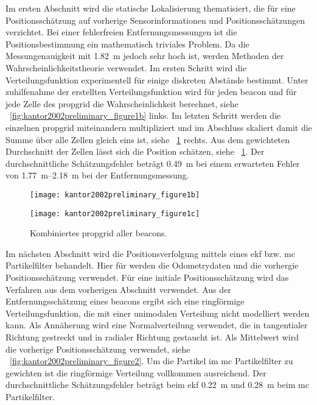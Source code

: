 Im ersten Abschnitt wird die statische Lokalisierung thematisiert, die für eine Positionsschätzung auf vorherige Sensorinformationen und Positionsschätzungen verzichtet. Bei einer fehlerfreien Entfernungsmessungen ist die Positionsbestimmung ein mathematisch triviales Problem. Da die Messungenauigkeit mit \SI{1.82}{\metre} jedoch sehr hoch ist, werden Methoden der Wahrscheinlichkeitstheorie verwendet. Im ersten Schritt wird die Verteilungsfunktion experimentell für einige diskreten Abstände bestimmt. Unter zuhilfenahme der erstellten Verteilungsfunktion wird für jeden \Gls{beacon} und für jede Zelle des \Gls{propgrid} die Wahrscheinlichkeit berechnet, siehe \figurename~\ref{fig:kantor2002preliminary_figure1b} links. Im letzten Schritt werden die einzelnen \Gls{propgrid} miteinandern multipliziert und im Abschluss skaliert damit die Summe über alle Zellen gleich eins ist, siehe \figurename~\ref{fig:kantor2002preliminary_figure1c} rechts. Aus dem gewichteten Durchschnitt der Zellen lässt sich die Position schätzen, siehe \figurename~\ref{fig:kantor2002preliminary_figure1c}. Der durchschnittliche Schätzungsfehler beträgt \SI{0.49}{\metre} bei einem erwarteten Fehler von \SIrange{1,77}{2,18}{\metre} bei der Entfernungsmessung.

\begin{figure}[htbp]
  \begin{minipage}[t]{0.45\linewidth}
    \centering
    \texttt{[image: kantor2002preliminary\_figure1b]}
    \caption{Links: \Gls{propgrid} pro \Gls{beacon}. Rechts: Kombination zweier \Glspl{propgrid}.}
    \label{fig:kantor2002preliminary_figure1b}
  \end{minipage}
  \hfill
  \begin{minipage}[t]{0.45\linewidth}
    \centering
    \texttt{[image: kantor2002preliminary\_figure1c]}
    \caption{Kombiniertes \Gls{propgrid} aller \Glspl{beacon}.}
    \label{fig:kantor2002preliminary_figure1c}
  \end{minipage}
\end{figure}

Im nächsten Abschnitt wird die Positionsverfolgung mittels eines \Gls{ekf} bzw. \Gls{mc} Partikelfilter behandelt. Hier für werden die Odometrydaten und die vorhergie Positionsschätzung verwendet. Für eine initiale Positionsschätzung wird das Verfahren aus dem vorherigen Abschnitt verwendet. Aus der Entfernungsschätzung eines \Glspl{beacon} ergibt sich eine ringförmige Verteilungsfunktion, die mit einer unimodalen Verteilung nicht modelliert werden kann. Als Annäherung wird eine Normalverteilung verwendet, die in tangentialer Richtung gestreckt und in radialer Richtung gestaucht ist. Als Mittelwert wird die vorherige Positionsschätzung verwendet, siehe \figurename~\ref{fig:kantor2002preliminary_figure2}. Um die Partikel im \Gls{mc} Partikelfilter zu gewichten ist die ringförmige Verteilung vollkommen ausreichend. Der durchschnittliche Schätzungsfehler beträgt beim \Gls{ekf} \SI{0.22}{\metre} und \SI{0.28}{\metre} beim \Gls{mc} Partikelfilter.

